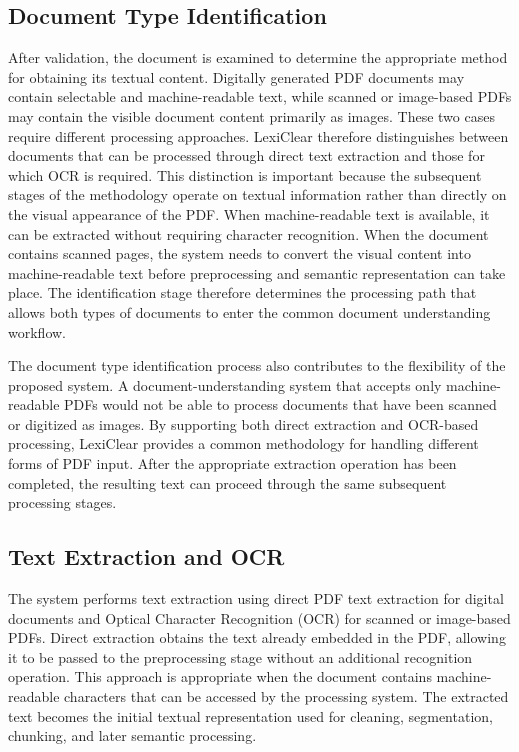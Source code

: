 \documentclass[12pt,a4paper,oneside]{report}
\begin{document}
\subsection{Document Type Identification}

After validation, the document is examined to determine the appropriate
method for obtaining its textual content. Digitally generated PDF documents
may contain selectable and machine-readable text, while scanned or
image-based PDFs may contain the visible document content primarily as
images. These two cases require different processing approaches. LexiClear
therefore distinguishes between documents that can be processed through
direct text extraction and those for which OCR is required. This distinction is important because the subsequent stages of the
methodology operate on textual information rather than directly on the
visual appearance of the PDF. When machine-readable text is available, it
can be extracted without requiring character recognition. When the document
contains scanned pages, the system needs to convert the visual content into
machine-readable text before preprocessing and semantic representation can
take place. The identification stage therefore determines the processing
path that allows both types of documents to enter the common document
understanding workflow.

The document type identification process also contributes to the flexibility
of the proposed system. A document-understanding system that accepts only
machine-readable PDFs would not be able to process documents that have been
scanned or digitized as images. By supporting both direct extraction and
OCR-based processing, LexiClear provides a common methodology for handling
different forms of PDF input. After the appropriate extraction operation has
been completed, the resulting text can proceed through the same subsequent
processing stages.

\subsection{Text Extraction and OCR}

The system performs text extraction using direct PDF text extraction for
digital documents and Optical Character Recognition (OCR) for scanned or
image-based PDFs. Direct extraction obtains the text already embedded in
the PDF, allowing it to be passed to the preprocessing stage without an
additional recognition operation. This approach is appropriate when the
document contains machine-readable characters that can be accessed by the
processing system. The extracted text becomes the initial textual
representation used for cleaning, segmentation, chunking, and later
semantic processing.
\end{document}
